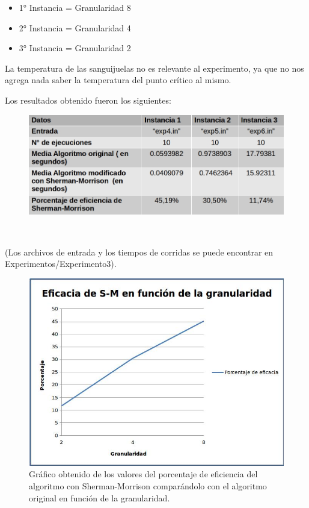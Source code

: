      \begin{itemize}
    \item 1° Instancia = Granularidad 8
    \item 2° Instancia = Granularidad 4
    \item 3° Instancia  = Granularidad 2
 \end{itemize}
 
  La temperatura de las sanguijuelas no es relevante al experimento, ya que no nos agrega nada saber la temperatura del punto crítico al mismo.
  
  Los resultados obtenido fueron los siguientes:
  
     \begin{figure}[H]
    \centering
    \includegraphics[scale=0.5]{graphs/grafico3.jpg}
    \end{figure}\
        
         (Los archivos de entrada y los tiempos de corridas se puede encontrar en Experimentos/Experimento3).


    \begin{figure}[H]
    \centering
    \includegraphics[scale=0.6]{graphs/graf.jpg}\caption{Gráfico obtenido de los valores del porcentaje de eficiencia del algoritmo con Sherman-Morrison comparándolo con el algoritmo original en función de la granularidad.}
    \end{figure}